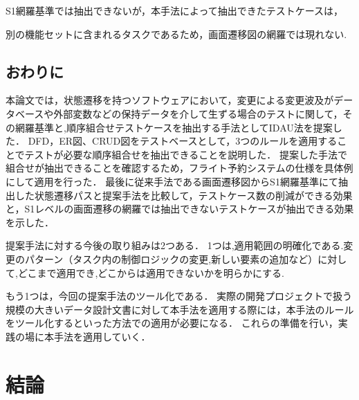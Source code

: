 \documentclass[a4paper,10pt]{jreport}
\begin{document}
S1網羅基準では抽出できないが，本手法によって抽出できたテストケースは，

別の機能セットに含まれるタスクであるため，画面遷移図の網羅では現れない.

\subsection{おわりに}

本論文では，状態遷移を持つソフトウェアにおいて，変更による変更波及がデータベースや外部変数などの保持データを介して生ずる場合のテストに関して，その網羅基準と,順序組合せテストケースを抽出する手法としてIDAU法を提案した．
DFD，ER図、CRUD図をテストベースとして，3つのルールを適用することでテストが必要な順序組合せを抽出できることを説明した．
提案した手法で組合せが抽出できることを確認するため，フライト予約システムの仕様を具体例にして適用を行った．
最後に従来手法である画面遷移図からS1網羅基準にて抽出した状態遷移パスと提案手法を比較して，テストケース数の削減ができる効果と，S1レベルの画面遷移の網羅では抽出できないテストケースが抽出できる効果を示した．

提案手法に対する今後の取り組みは2つある．
1つは,適用範囲の明確化である.変更のパターン（タスク内の制御ロジックの変更,新しい要素の追加など）に対して,どこまで適用でき,どこからは適用できないかを明らかにする.

もう1つは，今回の提案手法のツール化である．
実際の開発プロジェクトで扱う規模の大きいデータ設計文書に対して本手法を適用する際には，本手法のルールをツール化するといった方法での適用が必要になる．
これらの準備を行い，実践の場に本手法を適用していく．

\section{結論}




\newpage

\renewcommand{\bibname}{参考文献}

 

\end{document}
